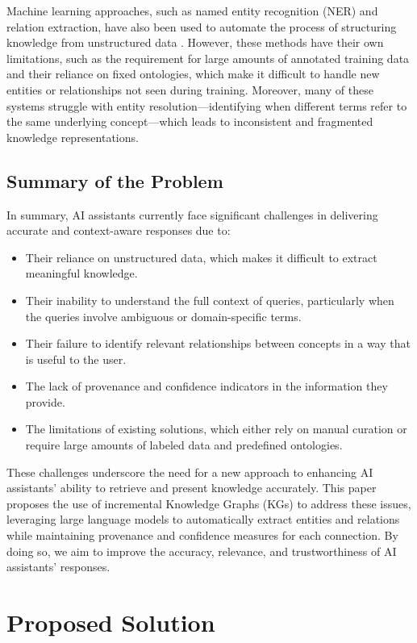 Machine learning approaches, such as named entity recognition (NER) and relation extraction, have also been used to automate the process of structuring knowledge from unstructured data \citep{nasar2021named}. However, these methods have their own limitations, such as the requirement for large amounts of annotated training data and their reliance on fixed ontologies, which make it difficult to handle new entities or relationships not seen during training. Moreover, many of these systems struggle with entity resolution—identifying when different terms refer to the same underlying concept—which leads to inconsistent and fragmented knowledge representations.

\subsection{Summary of the Problem}

In summary, AI assistants currently face significant challenges in delivering accurate and context-aware responses due to:
\begin{itemize}
    \item Their reliance on unstructured data, which makes it difficult to extract meaningful knowledge.
    \item Their inability to understand the full context of queries, particularly when the queries involve ambiguous or domain-specific terms.
    \item Their failure to identify relevant relationships between concepts in a way that is useful to the user.
    \item The lack of provenance and confidence indicators in the information they provide.
    \item The limitations of existing solutions, which either rely on manual curation or require large amounts of labeled data and predefined ontologies.
\end{itemize}

These challenges underscore the need for a new approach to enhancing AI assistants' ability to retrieve and present knowledge accurately. This paper proposes the use of incremental Knowledge Graphs (KGs) to address these issues, leveraging large language models to automatically extract entities and relations while maintaining provenance and confidence measures for each connection. By doing so, we aim to improve the accuracy, relevance, and trustworthiness of AI assistants’ responses.


\section{Proposed Solution}

